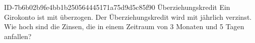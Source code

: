 \begin{exercise}
      {ID-7b6b02b9fe4bb1b250564445171a75d9d5c85f90}
      {Überziehungskredit}
  \ifproblem\problem
    Ein Girokonto ist mit  überzogen. Der Überziehungskredit wird
    mit  jährlich verzinst. Wie hoch sind die Zinsen, die in einem
    Zeitraum von \num{3} Monaten und \num{5} Tagen anfallen?
  \fi
\end{exercise}
